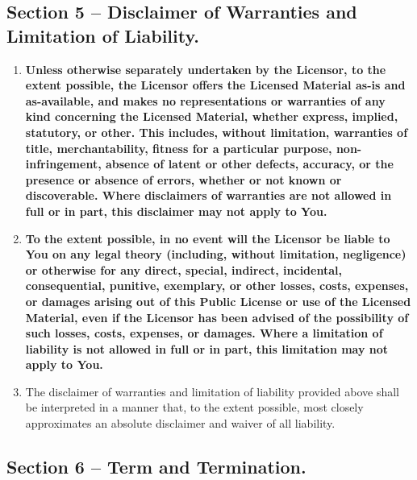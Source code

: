 \documentclass[]{book}
\begin{document}
\hypertarget{section-5-disclaimer-of-warranties-and-limitation-of-liability.}{%
\subsection{Section 5 -- Disclaimer of Warranties and Limitation of Liability.}\label{section-5-disclaimer-of-warranties-and-limitation-of-liability.}}

\begin{enumerate}
\def\labelenumi{\alph{enumi}.}
\item
  \textbf{Unless otherwise separately undertaken by the Licensor, to the extent possible, the Licensor offers the Licensed Material as-is and as-available, and makes no representations or warranties of any kind concerning the Licensed Material, whether express, implied, statutory, or other. This includes, without limitation, warranties of title, merchantability, fitness for a particular purpose, non-infringement, absence of latent or other defects, accuracy, or the presence or absence of errors, whether or not known or discoverable. Where disclaimers of warranties are not allowed in full or in part, this disclaimer may not apply to You.}
\item
  \textbf{To the extent possible, in no event will the Licensor be liable to You on any legal theory (including, without limitation, negligence) or otherwise for any direct, special, indirect, incidental, consequential, punitive, exemplary, or other losses, costs, expenses, or damages arising out of this Public License or use of the Licensed Material, even if the Licensor has been advised of the possibility of such losses, costs, expenses, or damages. Where a limitation of liability is not allowed in full or in part, this limitation may not apply to You.}
\item
  The disclaimer of warranties and limitation of liability provided above shall be interpreted in a manner that, to the extent possible, most closely approximates an absolute disclaimer and waiver of all liability.
\end{enumerate}

\hypertarget{section-6-term-and-termination.}{%
\subsection{Section 6 -- Term and Termination.}\label{section-6-term-and-termination.}}
\end{document}
